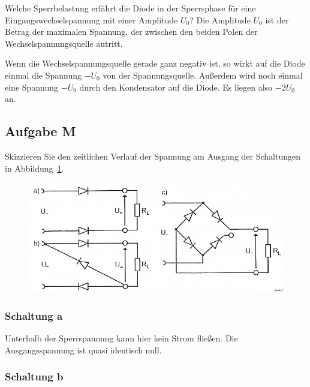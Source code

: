 \begin{problem}
	Welche Sperrbelastung erfährt die Diode in der Sperrsphase für eine
	Eingangswechselspannung mit einer Amplitude $U_0$? Die Amplitude $U_0$ ist
	der Betrag der maximalen Spannung, der zwischen den beiden Polen der
	Wechselspannungsquelle autritt.
\end{problem}

Wenn die Wechselspannungsquelle gerade ganz negativ ist, so wirkt auf die Diode
einmal die Spannung $- U_0$ von der Spannungsquelle. Außerdem wird noch einmal
eine Spannung $-U_0$ durch den Kondensator auf die Diode. Es liegen also
$-2U_0$ an.

\FloatBarrier
\subsection{Aufgabe M}

\begin{problem}
	Skizzieren Sie den zeitlichen Verlauf der Spannung am Ausgang der
	Schaltungen in Abbildung~\ref{fig:2-9}.
\end{problem}

\begin{figure}[htbp]
	\centering
	\includegraphics[width=\linewidth]{Bilder_aus_Anleitung/2-9.png}
	\caption{%
		\cite[Abbildung~2.9]{physik313-Anleitung}
	}
	\label{fig:2-9}
\end{figure}

\subsubsection{Schaltung a}

Unterhalb der Sperrspannung kann hier kein Strom fließen. Die Ausgangsspannung
ist quasi identisch null.

\subsubsection{Schaltung b}

